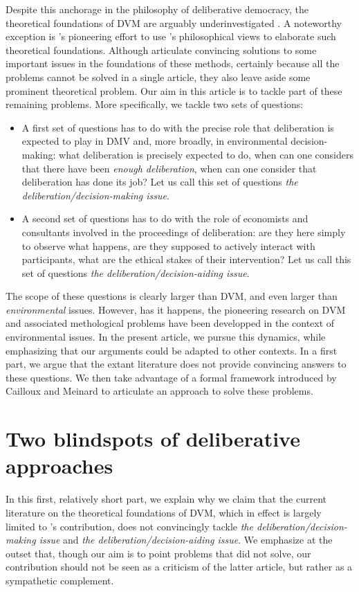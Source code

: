 \documentclass[smallextended,nospthms,natbib]{svjour3}
\begin{document}
Despite this anchorage in the philosophy of deliberative democracy, the theoretical foundations of DVM are arguably underinvestigated \citep{bartkowski_economic_2017,bartkowski_beyond_2018,bunse_what_2015,kenter_what_2015}. A noteworthy exception is \citet{bartkowski_beyond_2018}'s pioneering effort to use \citet{sen_idea_2009}'s philosophical views to elaborate such theoretical foundations. Although \citet{bartkowski_beyond_2018} articulate convincing solutions to some important issues in the foundations of these methods, certainly because all the problems cannot be solved in a single article, they also leave aside some prominent theoretical problem. Our aim in this article is to tackle part of these remaining problems. More specifically, we tackle two sets of questions:
\begin{itemize}
\item A first set of questions has to do with the precise role that deliberation is expected to play in DMV and, more broadly, in environmental decision-making: what deliberation is precisely expected to do, when can one considers that there have been \emph{enough deliberation}, when can one consider that deliberation has done its job? Let us call this set of questions \emph{the deliberation/decision-making issue}.
\item A second set of questions has to do with the role of economists and consultants involved in the proceedings of deliberation: are they here simply to observe what happens, are they supposed to actively interact with participants, what are the ethical stakes of their intervention? Let us call this set of questions \emph{the deliberation/decision-aiding issue}.
\end{itemize}
The scope of these questions is clearly larger than DVM, and even larger than \emph{environmental} issues. However, has it happens, the pioneering research on DVM and associated methological problems have been developped in the context of environmental issues. In the present article, we pursue this dynamics, while emphasizing that our arguments could be adapted to other contexts.
In a first part, we argue that the extant literature does not provide convincing answers to these questions. We then take advantage of a formal framework introduced by Cailloux and Meinard to articulate an approach to solve these problems.

\section{Two blindspots of deliberative approaches}
In this first, relatively short part, we explain why we claim that the current literature on the theoretical foundations of DVM, which in effect is largely limited to \citet{bartkowski_beyond_2018}'s contribution, does not convincingly tackle \emph{the deliberation/decision-making issue} and \emph{the deliberation/decision-aiding issue}. We emphasize at the outset that, though our aim is to point problems that \citet{bartkowski_beyond_2018} did not solve, our contribution should not be seen as a criticism of the latter article, but rather as a sympathetic complement.
\end{document}

